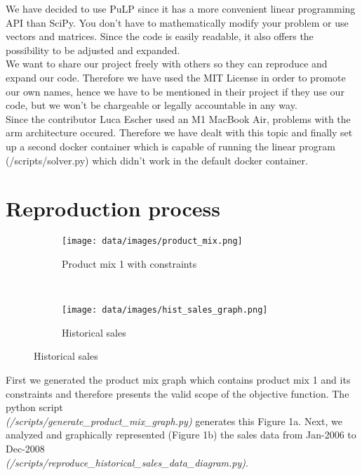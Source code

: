 \documentclass[11pt]{article}
\newenvironment{textbody}{\normalsize}\par
\begin{document}
\begin{textbody}
We have decided to use PuLP since it has a more convenient linear programming API than SciPy. You don’t have to mathematically modify your problem or use vectors and matrices. Since the code is easily readable, it also offers the possibility to be adjusted and expanded. \\

We want to share our project freely with others so they can reproduce and expand our code. Therefore we have used the MIT License in order to promote our own names, hence we have to be mentioned in their project if they use our code, but we won’t be chargeable or legally accountable in any way. \\

Since the contributor Luca Escher used an M1 MacBook Air, problems with the arm architecture occured. Therefore we have dealt with this topic and finally set up a second docker container which is capable of running the linear program (/scripts/solver.py) which didn’t work in the default docker container.
\end{textbody}

\section{Reproduction process}

\begin{figure}[h]
\centering
    \begin{subfigure}[t]{0.5\textwidth}
    \centering
        \texttt{[image: data/images/product\_mix.png]}
        \caption{Product mix 1 with constraints}
        \label{fig:product_mix_with_restrictions}
    \end{subfigure}%
    ~
    \begin{subfigure}[t]{0.5\textwidth}
    \centering
        \texttt{[image: data/images/hist\_sales\_graph.png]}
        \caption{Historical sales}
        \label{fig:hist_sales}
\end{subfigure}

\end{figure}

\vspace{1cm}

\begin{textbody}
    First we generated the product mix graph which contains product mix 1 and its constraints and therefore presents the valid scope of the objective function.
The python script \\ \emph{(/scripts/generate\_product\_mix\_graph.py)} generates this Figure
1a.
Next, we analyzed and graphically represented (Figure 1b) the sales data from Jan-2006 to Dec-2008 \\ \emph{(/scripts/reproduce\_historical\_sales\_data\_diagram.py)}.
\end{textbody}
\end{document}
